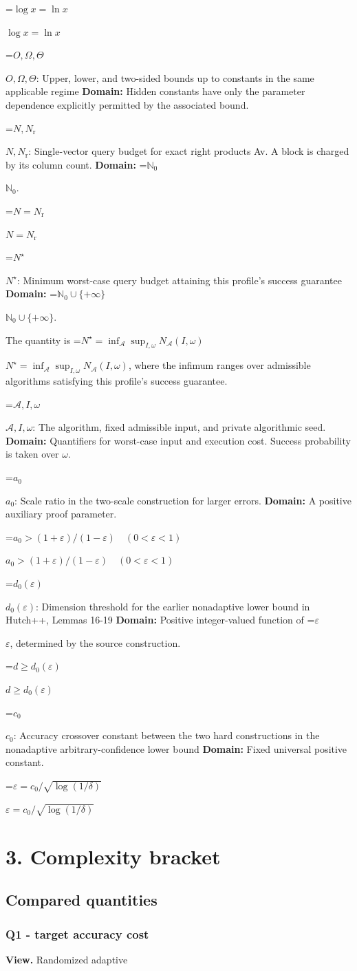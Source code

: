 \documentclass[10pt,a4paper]{article}
\newcommand{\AtlasMath}[1]{\par\begingroup\centering\setbox0=\hbox{$\displaystyle #1$}\ifdim\wd0>1.4\linewidth\typeout{ATLAS WIDE FORMULA: \the\wd0}\fi\ifdim\wd0>\linewidth\resizebox{\linewidth}{!}{\box0}\else\box0\fi\par\endgroup}
\newcommand{\AtlasInlineMath}[1]{\begingroup\setbox0=\hbox{$#1$}\ifdim\wd0>.4\linewidth\endgroup\AtlasMath{#1}\else\endgroup$#1$\fi}
\begin{document}
\AtlasInlineMath{\log x=\ln x}

\AtlasInlineMath{O,\Omega,\Theta}: Upper, lower, and two-sided bounds up to constants in the same applicable regime \textbf{Domain:} Hidden constants have only the parameter dependence explicitly permitted by the associated bound.

\AtlasInlineMath{N,N_{\mathrm r}}: Single-vector query budget for exact right products Av. A block is charged by its column count. \textbf{Domain:} \AtlasInlineMath{\mathbb N_0}.

\AtlasInlineMath{N=N_{\mathrm r}}

\AtlasInlineMath{N^\star}: Minimum worst-case query budget attaining this profile's success guarantee \textbf{Domain:} \AtlasInlineMath{\mathbb N_0\cup\{+\infty\}}.

The quantity is \AtlasInlineMath{N^\star=\inf_{\mathcal A}\sup_{I,\omega}N_{\mathcal A}(I,\omega)}, where the infimum ranges over admissible algorithms satisfying this profile's success guarantee.

\AtlasInlineMath{\mathcal A,I,\omega}: The algorithm, fixed admissible input, and private algorithmic seed. \textbf{Domain:} Quantifiers for worst-case input and execution cost. Success probability is taken over $\omega$.

\AtlasInlineMath{a_0}: Scale ratio in the two-scale construction for larger errors. \textbf{Domain:} A positive auxiliary proof parameter.

\AtlasInlineMath{a_0>(1+\varepsilon)/(1-\varepsilon)\quad(0<\varepsilon<1)}

\AtlasInlineMath{d_0(\varepsilon)}: Dimension threshold for the earlier nonadaptive lower bound in Hutch++, Lemmas 16-19 \textbf{Domain:} Positive integer-valued function of \AtlasInlineMath{\varepsilon}, determined by the source construction.

\AtlasInlineMath{d\ge d_0(\varepsilon)}

\AtlasInlineMath{c_0}: Accuracy crossover constant between the two hard constructions in the nonadaptive arbitrary-confidence lower bound \textbf{Domain:} Fixed universal positive constant.

\AtlasInlineMath{\varepsilon=c_0/\sqrt{\log(1/\delta)}}

\section{3. Complexity bracket}
\subsection{Compared quantities}
\subsubsection{Q1 - target accuracy cost}
\textbf{View.} Randomized adaptive
\end{document}
